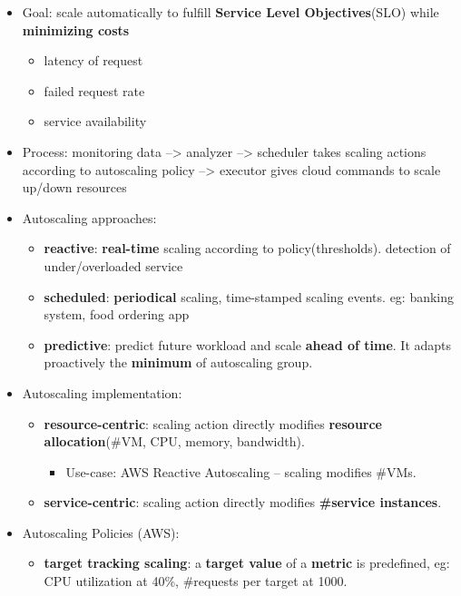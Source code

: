 \begin{itemize}
	\item Goal: scale automatically to fulfill \textbf{Service Level Objectives}(SLO) while \textbf{minimizing costs}
	\begin{itemize}
		\item latency of request
		\item failed request rate
		\item service availability
	\end{itemize}
	\item Process: monitoring data --> analyzer --> scheduler takes scaling actions according to autoscaling policy --> executor gives cloud commands to scale up/down resources 
	\item Autoscaling approaches:
	\begin{itemize}
		\item \textbf{reactive}: \textbf{real-time} scaling according to policy(thresholds). detection of under/overloaded service
		\item \textbf{scheduled}: \textbf{periodical} scaling, time-stamped scaling events. eg: banking system, food ordering app
		\item \textbf{predictive}: predict future workload and scale \textbf{ahead of time}. It adapts proactively the \textbf{minimum} of autoscaling group.
	\end{itemize}
	\item Autoscaling implementation:
	\begin{itemize}
		\item \textbf{resource-centric}: scaling action directly modifies \textbf{resource allocation}(\#VM, CPU, memory, bandwidth). 
		\begin{itemize}
			\item Use-case: AWS Reactive Autoscaling -- scaling modifies \#VMs.
		\end{itemize}
		\item \textbf{service-centric}: scaling action directly modifies \textbf{\#service instances}. 
	\end{itemize}
	\item Autoscaling Policies (AWS):
	\begin{itemize}
		
		\item \textbf{target tracking scaling}: a \textbf{target value} of a \textbf{metric} is predefined, eg: CPU utilization at 40\%, \#requests per target at 1000. 
		

\end{itemize}
\end{itemize}
